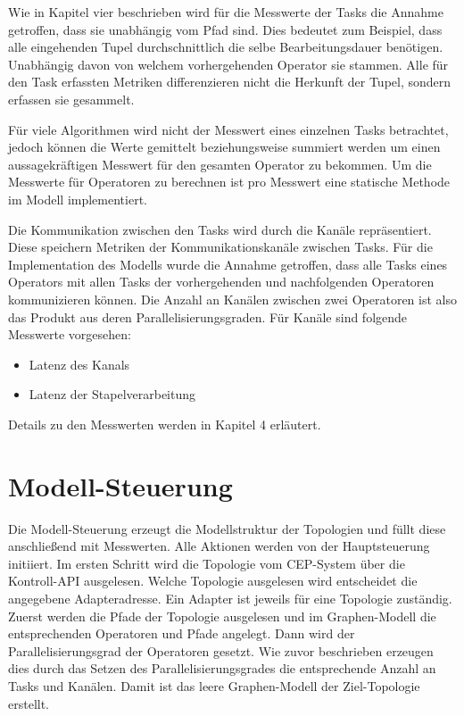 Wie in Kapitel vier beschrieben wird für die Messwerte der Tasks die Annahme getroffen, dass sie unabhängig vom Pfad sind.
Dies bedeutet zum Beispiel, dass alle eingehenden Tupel durchschnittlich die selbe Bearbeitungsdauer benötigen.
Unabhängig davon von welchem vorhergehenden Operator sie stammen.
Alle für den Task erfassten Metriken differenzieren nicht die Herkunft der Tupel, sondern erfassen sie gesammelt.

Für viele Algorithmen wird nicht der Messwert eines einzelnen Tasks betrachtet, jedoch können die Werte gemittelt beziehungsweise summiert werden um einen aussagekräftigen Messwert für den gesamten Operator zu bekommen.
Um die Messwerte für Operatoren zu berechnen ist pro Messwert eine statische Methode im Modell implementiert.

Die Kommunikation zwischen den Tasks wird durch die Kanäle repräsentiert.
Diese speichern Metriken der Kommunikationskanäle zwischen Tasks.
Für die Implementation des Modells wurde die Annahme getroffen, dass alle Tasks eines Operators mit allen Tasks der vorhergehenden und nachfolgenden Operatoren kommunizieren können.
Die Anzahl an Kanälen zwischen zwei Operatoren ist also das Produkt aus deren Parallelisierungsgraden.
Für Kanäle sind folgende Messwerte vorgesehen:

\begin{itemize}
\item{Latenz des Kanals}
\item{Latenz der Stapelverarbeitung}
\end{itemize}

Details zu den Messwerten werden in Kapitel 4 erläutert.

\section{Modell-Steuerung}

Die Modell-Steuerung erzeugt die Modellstruktur der Topologien und füllt diese anschließend mit Messwerten.
Alle Aktionen werden von der Hauptsteuerung initiiert.
Im ersten Schritt wird die Topologie vom CEP-System über die Kontroll-API ausgelesen.
Welche Topologie ausgelesen wird entscheidet die angegebene Adapteradresse.
Ein Adapter ist jeweils für eine Topologie zuständig.
Zuerst werden die Pfade der Topologie ausgelesen und im Graphen-Modell die entsprechenden Operatoren und Pfade angelegt.
Dann wird der Parallelisierungsgrad der Operatoren gesetzt.
Wie zuvor beschrieben erzeugen dies durch das Setzen des Parallelisierungsgrades die entsprechende Anzahl an Tasks und Kanälen.
Damit ist das leere Graphen-Modell der Ziel-Topologie erstellt.

